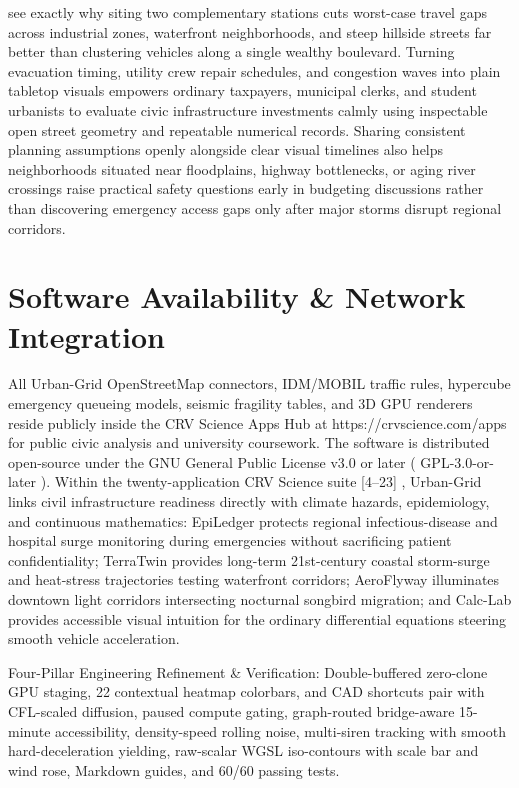 \documentclass[10pt,letterpaper]{article}
\begin{document}
see exactly why siting two complementary stations cuts worst-case travel gaps across industrial zones, waterfront neighborhoods, and steep hillside streets far better than clustering vehicles along a single wealthy boulevard. Turning evacuation timing, utility crew repair schedules, and congestion waves into plain tabletop visuals empowers ordinary taxpayers, municipal clerks, and student urbanists to evaluate civic infrastructure investments calmly using inspectable open street geometry and repeatable numerical records. Sharing consistent planning assumptions openly alongside clear visual timelines also helps neighborhoods situated near floodplains, highway bottlenecks, or aging river crossings raise practical safety questions early in budgeting discussions rather than discovering emergency access gaps only after major storms disrupt regional corridors.

\section{Software Availability \& Network Integration}
All Urban-Grid OpenStreetMap connectors, IDM/MOBIL traffic rules, hypercube emergency queueing models, seismic fragility tables, and 3D GPU renderers reside publicly inside the CRV Science Apps Hub at https://crvscience.com/apps for public civic analysis and university coursework. The software is distributed open-source under the GNU General Public License v3.0 or later ( GPL-3.0-or-later ). Within the twenty-application CRV Science suite [4--23] , Urban-Grid links civil infrastructure readiness directly with climate hazards, epidemiology, and continuous mathematics: EpiLedger protects regional infectious-disease and hospital surge monitoring during emergencies without sacrificing patient confidentiality; TerraTwin provides long-term 21st-century coastal storm-surge and heat-stress trajectories testing waterfront corridors; AeroFlyway illuminates downtown light corridors intersecting nocturnal songbird migration; and Calc-Lab provides accessible visual intuition for the ordinary differential equations steering smooth vehicle acceleration.

Four-Pillar Engineering Refinement \& Verification: Double-buffered zero-clone GPU staging, 22 contextual heatmap colorbars, and CAD shortcuts pair with CFL-scaled diffusion, paused compute gating, graph-routed bridge-aware 15-minute accessibility, density-speed rolling noise, multi-siren tracking with smooth hard-deceleration yielding, raw-scalar WGSL iso-contours with scale bar and wind rose, Markdown guides, and 60/60 passing tests.
\end{document}

